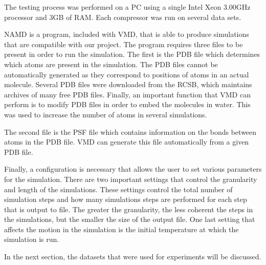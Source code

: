 \documentclass[a4paper,11pt]{report}
\begin{document}
The testing process was performed on a PC using a single Intel Xeon 3.00GHz processor and 3GB of RAM. Each compressor was run on several data sets. 

NAMD is a program, included with VMD, that is able to produce simulations that are compatible with our project. The program requires three files to be present in order to run the simulation. The first is the PDB file which determines which atoms are present in the simulation. The PDB files cannot be automatically generated as they correspond to positions of atoms in an actual molecule. Several PDB files were downloaded from the RCSB, which maintains archives of many free PDB files\cite{rcsb}. Finally, an important function that VMD can perform is to modify PDB files in order to embed the molecules in water. This was used to increase the number of atoms in several simulations.

The second file is the PSF file which contains information on the bonds between atoms in the PDB file. VMD can generate this file automatically from a given PDB file. 

Finally, a configuration is necessary that allows the user to set various parameters for the simulation. There are two important settings that control the granularity and length of the simulations. These settings control the total number of simulation steps and how many simulations steps are performed for each step that is output to file. The greater the granularity, the less coherent the steps in the simulations, but the smaller the size of the output file. One last setting that affects the motion in the simulation is the initial temperature at which the simulation is run.

In the next section, the datasets that were used for experiments will be discussed.
\end{document}
